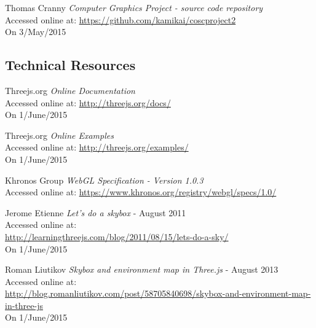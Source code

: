 \begin{thebibliography}{99}

    Thomas Cranny
    \textit{Computer Graphics Project - source code repository}\\
    Accessed online at:
    \href{https://github.com/kamikai/cosc_project2}{https://github.com/kamikai/cosc{\textunderscore}project2}\\
    On 3/May/2015

\subsection{Technical Resources}
\label{ref:technical_resources}

        Threejs.org
        \textit{Online Documentation}\\
        Accessed online at:
        \href{http://threejs.org/docs/}{http://threejs.org/docs/}\\
        On 1/June/2015

        Threejs.org
        \textit{Online Examples}\\
        Accessed online at:
        \href{http://threejs.org/examples/}{http://threejs.org/examples/}\\
        On 1/June/2015

        Khronos Group
        \textit{WebGL Specification - Version 1.0.3}\\
        Accessed online at:
        \href{https://www.khronos.org/registry/webgl/specs/1.0/1}{https://www.khronos.org/registry/webgl/specs/1.0/}

        Jerome Etienne
        \textit{Let's do a skybox} - August 2011 \\
        Accessed online at: \\
        \href{http://learningthreejs.com/blog/2011/08/15/lets-do-a-sky/}{http://learningthreejs.com/blog/2011/08/15/lets-do-a-sky/}\\
        On 1/June/2015

        Roman Liutikov
        \textit{Skybox and environment map in Three.js} - August 2013 \\
        Accessed online at: \\
        \href{http://blog.romanliutikov.com/post/58705840698/skybox-and-environment-map-in-three-js}{http://blog.romanliutikov.com/post/58705840698/skybox-and-environment-map-in-three-js}\\
        On 1/June/2015


\end{thebibliography}
